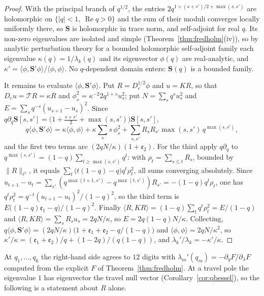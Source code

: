 \documentclass[11pt]{article}
\theoremstyle{plain}
\theoremstyle{definition}
\theoremstyle{remark}
\renewcommand{\Re}{\operatorname{Re}}
\begin{document}
\begin{proof}
With the principal branch of $q^{1/2}$, the entries $2q^{1+(s+s')/2+\max(s,s')}$ are holomorphic
on $\{|q|<1,\ \Re q>0\}$ and the sum of their moduli converges locally uniformly there, so
$\mathbf S$ is holomorphic in trace norm, and self-adjoint for real $q$. Its non-zero eigenvalues are
isolated and simple (Theorem~\ref{thm:fredholm}\textup{(iv)}), so by analytic perturbation theory for
a bounded holomorphic self-adjoint family \cite[Ch.~II and Ch.~VII]{Kato} each eigenvalue
$\kappa(q)=1/\lambda_k(q)$ and its eigenvector $\phi(q)$ are real-analytic, and
$\kappa'=\langle\phi,\mathbf S'\phi\rangle/\langle\phi,\phi\rangle$. No $q$-dependent domain
enters: $\mathbf S(q)$ is a bounded family.

It remains to evaluate $\langle\phi,\mathbf S'\phi\rangle$. Put $R=D_e^{1/2}\phi$ and $u=KR$, so
that $D_eu=\mathcal TR=\kappa R$ and $\phi_s^2=\kappa^{-2}2q^{1+s}u_s^2$; put
$N=\sum_sq^su_s^2$ and $E=\sum_sq^{-s}(u_{s+1}-u_s)^2$. Since
$q\partial_q\mathbf S[s,s']=\bigl(1+\tfrac{s+s'}2+\max(s,s')\bigr)\mathbf S[s,s']$,
\[
   q\langle\phi,\mathbf S'\phi\rangle=\kappa\langle\phi,\phi\rangle+\kappa\sum_ss\,\phi_s^2
   +\sum_{s,s'}R_sR_{s'}\max(s,s')\,q^{\max(s,s')},
\]
and the first two terms are $(2qN/\kappa)(1+\mathfrak e_2)$. For the third apply $q\partial_q$ to
$q^{\max(s,s')}=(1-q)\sum_{t\ge\max(s,s')}q^t$: with $\rho_t=\sum_{s\le t}R_s$, bounded by
$\|R\|_{\ell^1}$, it equals $\sum_t\bigl(t(1-q)-q\bigr)q^t\rho_t^2$, all sums converging absolutely.
Since $u_{t+1}-u_t=\sum_{s'}(q^{\max(t+1,s')}-q^{\max(t,s')})R_{s'}=-(1-q)q^t\rho_t$, one has
$q^t\rho_t^2=q^{-t}(u_{t+1}-u_t)^2/(1-q)^2$, so the third term is
$E\bigl((1-q)\mathfrak e_1-q\bigr)/(1-q)^2$. Finally $\langle R,KR\rangle=(1-q)\sum_tq^t\rho_t^2
=E/(1-q)$ and $\langle R,KR\rangle=\sum_sR_su_s=2qN/\kappa$, so $E=2q(1-q)N/\kappa$. Collecting,
$q\langle\phi,\mathbf S'\phi\rangle=(2qN/\kappa)\bigl(1+\mathfrak e_1+\mathfrak e_2-q/(1-q)\bigr)$
and $\langle\phi,\phi\rangle=2qN/\kappa^2$, so
$\kappa'/\kappa=(\mathfrak e_1+\mathfrak e_2)/q+(1-2q)/(q(1-q))$, and
$\lambda_k'/\lambda_k=-\kappa'/\kappa$.
\end{proof}

\noindent At $q_1,\dots,q_6$ the right-hand side agrees to $12$ digits with
$\lambda_m'(q_m)=-\partial_qF/\partial_\lambda F$ computed from the explicit $F$ of
Theorem~\ref{thm:fredholm}. At a travel pole the eigenvalue $1$ has eigenvector the travel null vector
(Corollary~\ref{cor:qbessel}), so the following is a statement about $R$ alone.
\end{document}
